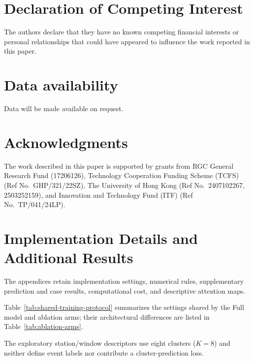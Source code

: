 \documentclass[a4paper,fleqn]{cas-dc}
\begin{document}
\printcredits

\section*{Declaration of Competing Interest}
The authors declare that they have no known competing financial interests or personal relationships that could have appeared to influence the work reported in this paper.

\section*{Data availability}
Data will be made available on request.

\section*{Acknowledgments}
The work described in this paper is supported by grants from RGC General Research Fund (17206126), Technology Cooperation Funding Scheme (TCFS) (Ref No.\ GHP/321/22SZ), The University of Hong Kong (Ref No.\ 2407102267, 2503252159), and Innovation and Technology Fund (ITF) (Ref No.\ TP/041/24LP).




\appendix
\renewcommand{\dblfloatpagefraction}{0.7}
\section{Implementation Details and Additional Results}\label{app:additional}

The appendices retain implementation settings, numerical rules, supplementary prediction and case results, computational cost, and descriptive attention maps.

Table~\ref{tab:shared-training-protocol} summarizes the settings shared by the Full model and ablation arms; their architectural differences are listed in Table~\ref{tab:ablation-arms}.

The exploratory station/window descriptors use eight clusters ($K=8$) and neither define event labels nor contribute a cluster-prediction loss.
\end{document}
